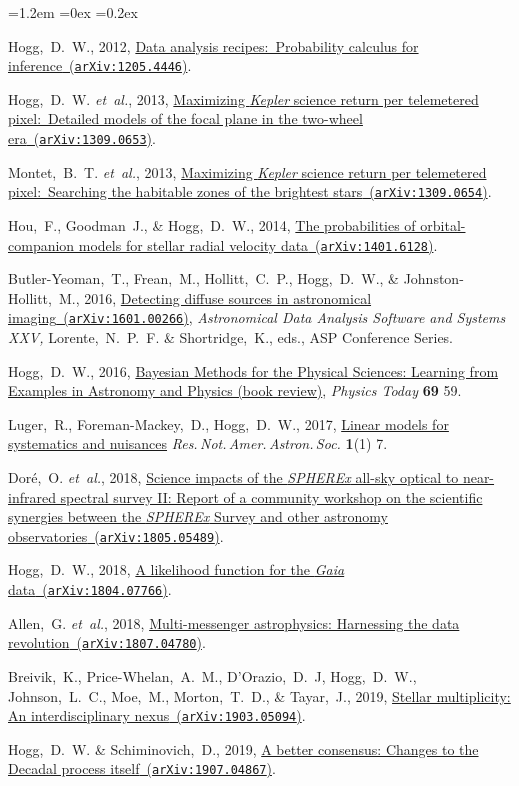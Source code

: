 \documentclass[10pt,letterpaper]{article}
\newcommand{\foreign}[1]{\textsl{#1}}
\newcommand{\etal}{\foreign{et~al.}}
\newcommand{\project}[1]{\textsl{#1}}
\newcommand{\doi}[2]{\href{http://dx.doi.org/#1}{{#2}}}
\newcommand{\arxiv}[2]{\href{http://arxiv.org/abs/#1}{{#2}\ (\texttt{arXiv:#1})}}
\newcounter{refpubnum}
\newcommand{\hogglist}{%
    \rightmargin=0in
    \leftmargin=1.2em
    \topsep=0ex
    \partopsep=0pt
    \itemsep=0.2ex
    \parsep=0pt
    \itemindent=-1.0\leftmargin
    \listparindent=0.0\leftmargin
    \settowidth{\labelsep}{~}
    \usecounter{refpubnum}
  }
\begin{document}
\begin{list}{}{\hogglist}
\item
Hogg,~D.~W., 2012,
\arxiv{1205.4446}{Data analysis recipes:\ Probability calculus for inference}.
\item
Hogg,~D.~W. \etal, 2013,
\arxiv{1309.0653}{Maximizing \project{Kepler} science return per telemetered pixel:\ Detailed models of the focal plane in the two-wheel era}.
\item
Montet,~B.~T. \etal, 2013,
\arxiv{1309.0654}{Maximizing \project{Kepler} science return per telemetered pixel:\ Searching the habitable zones of the brightest stars}.
\item
Hou,~F., Goodman~J., \& Hogg,~D.~W., 2014,
\arxiv{1401.6128}{The probabilities of orbital-companion models for stellar radial velocity data}.
\item
Butler-Yeoman,~T., Frean,~M., Hollitt,~C.~P., Hogg,~D.~W., \& Johnston-Hollitt,~M., 2016,
\arxiv{1601.00266}{Detecting diffuse sources in astronomical imaging},
\textit{Astronomical Data Analysis Software and Systems XXV,} 
Lorente,~N.~P.~F. \& Shortridge,~K., eds., 
ASP Conference Series. %
\item
Hogg,~D.~W., 2016,
\doi{10.1063/PT.3.3200}{Bayesian Methods for the Physical Sciences: Learning from Examples in Astronomy and Physics (book review)},
\textit{Physics Today} \textbf{69} 59.
\item
Luger,~R., Foreman-Mackey,~D., Hogg,~D.~W., 2017,
\doi{10.3847/2515-5172/aa96b5}{Linear models for systematics and nuisances}
\textit{Res.\,Not.\,Amer.\,Astron.\,Soc.} \textbf{1}(1) 7.
\item
Dor\'e,~O. \etal, 2018,
\arxiv{1805.05489}{Science impacts of the \project{SPHEREx} all-sky optical to near-infrared spectral survey II: Report of a community workshop on the scientific synergies between the \project{SPHEREx} Survey and other astronomy observatories}.
\item
Hogg,~D.~W., 2018,
\arxiv{1804.07766}{A likelihood function for the \project{Gaia} data}.
\item
Allen,~G. \etal, 2018,
\arxiv{1807.04780}{Multi-messenger astrophysics: Harnessing the data revolution}.
\item
Breivik,~K., Price-Whelan,~A.~M., D'Orazio,~D.~J, Hogg,~D.~W., Johnson,~L.~C., Moe,~M., Morton,~T.~D.,
\& Tayar,~J., 2019,
\arxiv{1903.05094}{Stellar multiplicity: An interdisciplinary nexus}.
\item
Hogg,~D.~W. \& Schiminovich,~D., 2019,
\arxiv{1907.04867}{A better consensus: Changes to the Decadal process itself}.

\end{list}
\end{document}
